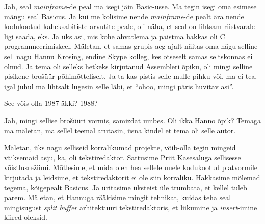 
Jah, seal \emph{mainframe}-de peal ma isegi jäin Basic-usse. Ma tegin isegi oma esimese mängu seal Basicus. Ja kui me kolisime nende \emph{mainframe}-de pealt ära nende kodukootud kaheksabitiste arvutite peale, oli näha, et seal on lihtsam  riistvarale ligi saada, eks. Ja üks asi, mis kohe ahvatlema ja paistma hakkas oli C programmeerimiskeel.  Mäletan, et samas grupis aeg-ajalt näitas oma nägu selline sell nagu Hannu Krosing, endine Skype kolleg, kes  otseselt samas seltskonnas ei olnud. Ja tema oli selleks hetkeks  kirjutanud Assembleri õpiku, oli mingi selline pisikene brošüür põhimõtteliselt.  Ja ta kas pistis selle mulle pihku või, ma ei tea, igal juhul ma lihtsalt lugesin selle läbi, et \enquote{ohoo, mingi päris huvitav asi}. 


See võis olla 1987 äkki? 1988?


Jah, mingi sellise brošüüri vormis, samizdat umbes. Oli ikka Hanno õpik? Temaga ma mäletan, ma sellel teemal arutasin,  üsna kindel et tema oli selle autor.


Mäletan, üks nagu selliseid korralikumad projekte, võib-olla tegin mingeid väiksemaid asju, ka, oli tekstiredaktor\label{sisu!jaani_tekstiredaktor}. Sattusime Priit Kasesaluga sellisesse võistlusrežiimi. Mõtlesime, et mida olen hea sellele uuele kodukootud platvormile kirjutada ja leidsime, et tekstiredaktorit ei ole siin korraliku. Hakkasime mõlemad tegema, kõigepealt Basicus. Ja üritasime üksteist üle trumbata, et kellel tuleb parem. Mäletan, et Hannuga rääkisime  mingit tehnikat, kuidas teha seal mingisugust \emph{split buffer} arhitektuuri tekstiredaktoris, et liikumine ja \emph{insert}-imine kiired oleksid.

